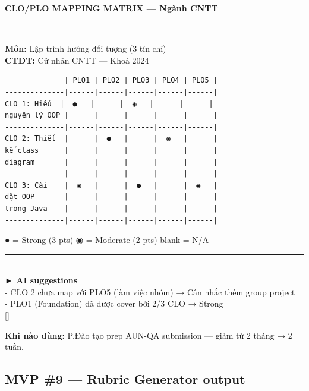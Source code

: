 \documentclass[11pt,a4paper]{article}
\begin{document}
\begin{mockbox}
{\bfseries\color{ink} CLO/PLO MAPPING MATRIX --- Ngành CNTT}\\[6pt]
\rule{\linewidth}{0.3pt}\\[4pt]
{\bfseries Môn:} Lập trình hướng đối tượng (3 tín chỉ)\\
{\bfseries CTĐT:} Cử nhân CNTT --- Khoá 2024\\[6pt]
\begin{verbatim}
              | PLO1 | PLO2 | PLO3 | PLO4 | PLO5 |
--------------|------|------|------|------|------|
CLO 1: Hiểu  |  ●   |      |  ◉   |      |      |
nguyên lý OOP |      |      |      |      |      |
--------------|------|------|------|------|------|
CLO 2: Thiết  |      |  ●   |      |  ◉   |      |
kế class      |      |      |      |      |      |
diagram       |      |      |      |      |      |
--------------|------|------|------|------|------|
CLO 3: Cài    |  ◉   |      |  ●   |      |  ◉   |
đặt OOP       |      |      |      |      |      |
trong Java    |      |      |      |      |      |
--------------|------|------|------|------|------|
\end{verbatim}
\textcolor{mid}{● = Strong (3 pts) \quad ◉ = Moderate (2 pts) \quad blank = N/A}\\[6pt]
\rule{\linewidth}{0.3pt}\\[4pt]
{\bfseries\color{ink} ► AI suggestions}\\[2pt]
- CLO 2 chưa map với PLO5 (làm việc nhóm) → Cân nhắc thêm group project\\
- PLO1 (Foundation) đã được cover bởi 2/3 CLO → Strong\\[4pt]
{[] }
\end{mockbox}

\textbf{Khi nào dùng:} P.Đào tạo prep AUN-QA submission --- giảm từ 2 tháng → 2 tuần.

\subsection{MVP \#9 --- Rubric Generator output}
\end{document}
